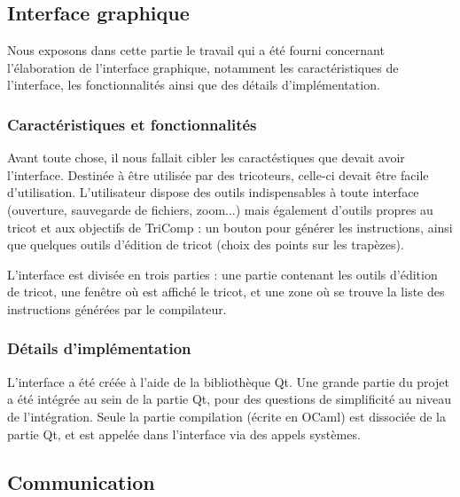 \documentclass{article}
\begin{document}
\subsection{Interface graphique}

Nous exposons dans cette partie le travail qui a été fourni concernant l'élaboration de l'interface graphique, notamment les caractéristiques de l'interface, les fonctionnalités ainsi que des détails d'implémentation.

\subsubsection{Caractéristiques et fonctionnalités}

Avant toute chose, il nous fallait cibler les caractéstiques que devait avoir l'interface. Destinée à être utilisée par des tricoteurs, celle-ci devait être facile d'utilisation. L'utilisateur dispose des outils indispensables à toute interface (ouverture, sauvegarde de fichiers, zoom...) mais également d'outils propres au tricot et aux objectifs de TriComp : un bouton pour générer les instructions, ainsi que quelques outils d'édition de tricot (choix des points sur les trapèzes).

L'interface est divisée en trois parties : une partie contenant les outils d'édition de tricot, une fenêtre où est affiché le tricot, et une zone où se trouve la liste des instructions générées par le compilateur.





\subsubsection{Détails d'implémentation}

L'interface a été créée à l'aide de la bibliothèque Qt. Une grande partie du projet a été intégrée au sein de la partie Qt, pour des questions de simplificité au niveau de l'intégration. Seule la partie compilation (écrite en OCaml) est dissociée de la partie Qt, et est appelée dans l'interface via des appels systèmes. 

\subsection{Communication}
\end{document}
